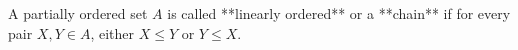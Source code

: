A partially ordered set $A$ is called **linearly ordered** or a **chain** if for every pair $X, Y \in A$, either $X \leq Y$ or $Y \leq X$.
